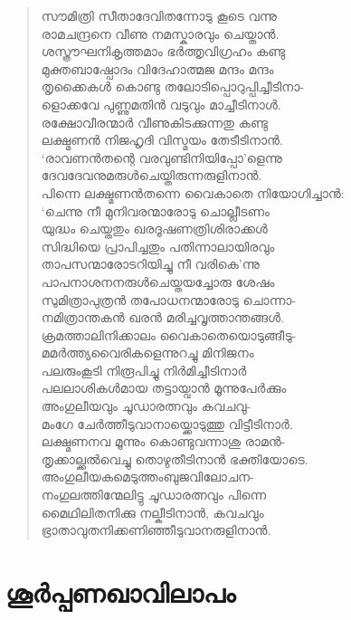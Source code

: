 \begin{verse}
സൗമിത്രി സീതാദേവിതന്നോടു കൂടെ വന്നു\\
രാമചന്ദ്രനെ വീണു നമസ്കാരവും ചെയ്താന്‍.\\
ശസ്ത്രൗഘനികൃത്തമാം ഭര്‍ത്തൃവിഗ്രഹം കണ്ടു\\
മുക്തബാഷ്പോദം വിദേഹാത്മജ മന്ദം മന്ദം\\
തൃക്കൈകള്‍ കൊണ്ടു തലോടിപ്പൊറുപ്പിച്ചീടിനാ-\\
ളൊക്കവേ പുണ്ണുമതിന്‍ വടുവും മാച്ചീടിനാള്‍.\\
രക്ഷോവീരന്മാര്‍ വീണുകിടക്കുന്നതു കണ്ടു\\
ലക്ഷ്മണന്‍ നിജഹൃദി വിസ്മയം തേടീടിനാന്‍.\\
‘രാവണന്‍തന്റെ വരവുണ്ടിനിയിപ്പോ’ളെന്നു\\
ദേവദേവനുമരുള്‍ചെയ്തിരുന്നരുളിനാന്‍.\\
പിന്നെ ലക്ഷ്മണന്‍തന്നെ വൈകാതെ നിയോഗിച്ചാന്‍:\\
‘ചെന്നു നീ മുനിവരന്മാരോടു ചൊല്ലീടണം\\
യുദ്ധം ചെയ്തതും ഖരദൂഷണത്രിശിരാക്കള്‍\\
സിദ്ധിയെ പ്രാപിച്ചതും പതിന്നാലായിരവും\\
താപസന്മാരോടറിയിച്ചു നീ വരികെ’ന്നു\\
പാപനാശനനരുള്‍ചെയ്തയച്ചോരു ശേഷം\\
സുമിത്രാപുത്രന്‍ തപോധനന്മാരോടു ചൊന്നാ-\\
നമിത്രാന്തകന്‍ ഖരന്‍ മരിച്ചവൃത്താന്തങ്ങള്‍.\\
ക്രമത്താലിനിക്കാലം വൈകാതെയൊടുങ്ങീടു-\\
മമര്‍ത്ത്യവൈരികളെന്നുറച്ചു മിനിജനം\\
പലരുംകൂടി നിരൂപിച്ചു നിര്‍മിച്ചീടിനാര്‍\\
പലലാശികള്‍മായ തട്ടായ്വാന്‍ മൂന്നുപേര്‍ക്കും\\
അംഗുലീയവും ചൂഡാരത്നവും കവചവു-\\
മംഗേ ചേര്‍ത്തീടുവാനായ്ക്കൊടുത്തു വിട്ടീടിനാര്‍.\\
ലക്ഷ്മണനവ മൂന്നും കൊണ്ടുവന്നാശു രാമന്‍-\\
തൃക്കാല്ക്കല്‍വെച്ചു തൊഴുതീടിനാന്‍ ഭക്തിയോടെ.\\
അംഗുലീയകമെടുത്തംബുജവിലോചന-\\
നംഗുലത്തിന്മേലിട്ടു ചൂഡാരത്നവും പിന്നെ\\
മൈഥിലിതനിക്കു നല്കീടിനാന്‍, കവചവും\\
ഭ്രാതാവുതനിക്കണിഞ്ഞീടുവാനരുളിനാന്‍.
\end{verse}

\section{ശൂര്‍പ്പണഖാവിലാപം}

